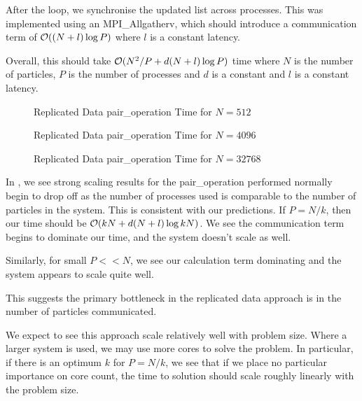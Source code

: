 After the loop, we synchronise the updated list across processes.
This was implemented using an MPI\_Allgatherv, which
should introduce a communication term of $\mathcal{O}{((N + l)\log{P})}$
where $l$ is a constant latency.

Overall, this should take $\mathcal{O}{(N^2/P + d(N+l)\log{P})}$ time
where $N$ is the number of particles,
$P$ is the number of processes and
$d$ is a constant and
$l$ is a constant latency.

\begin{figure}
    
    \caption{Replicated Data pair\_operation Time for $N = 512$}
    \label{fig:v0_replicated_pair_operation_512_logtime}
\end  {figure}

\begin{figure}
    
    \caption{Replicated Data pair\_operation Time for $N = 4096$}
    \label{fig:v0_replicated_pair_operation_4096_logtime}
\end  {figure}

\begin{figure}
    
    \caption{Replicated Data pair\_operation Time for $N = 32768$}
    \label{fig:v0_replicated_pair_operation_32768_logtime}
\end  {figure}

In , we see strong scaling results
for the pair\_operation performed normally begin to drop off as the number
of processes used is comparable to the number of particles in the system.
%
This is consistent with our predictions.
%
If $P = N/k$, then our time should be $\mathcal{O}{(kN + d(N+l)\log{kN})}$.
%
We see the communication term begins to dominate our time, and
the system doesn't scale as well.

Similarly, for small $P << N$, we see our calculation term dominating
and the system appears to scale quite well.

This suggests the primary bottleneck in the replicated data approach
is in the number of particles communicated.

We expect to see this approach scale relatively well
with problem size.
%
Where a larger system is used, we may use more cores to solve the problem.
%
In particular, if there is an optimum $k$ for $P = N/k$, we see that
if we place no particular importance on core count, the time to solution
should scale roughly linearly with the problem size.

